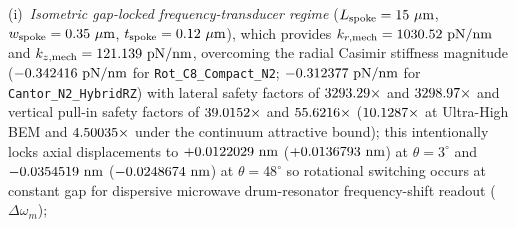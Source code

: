 (i)~\emph{Isometric gap-locked frequency-transducer regime} ($L_{\rm spoke} = \NatureRotCeightCompactNtwoLateralStabilityLSpokeUm{}\ \mu\text{m}$, $w_{\rm spoke} = \NatureRotCeightCompactNtwoLateralStabilityWSpokeUm{}\ \mu\text{m}$, $t_{\rm spoke} = \NatureRotCeightCompactNtwoLateralStabilityTSpokeUm{}\ \mu\text{m}$), which provides $k_{r,\rm mech} = 1030.52{}\text{ pN/nm}$ and $k_{z,\rm mech} = 121.139{}\text{ pN/nm}$, overcoming the radial Casimir stiffness magnitude ($-0.342416{}\text{ pN/nm}$ for \texttt{Rot\_C8\_Compact\_N2}; $-0.312377{}\text{ pN/nm}$ for \texttt{Cantor\_N2\_HybridRZ}) with lateral safety factors of $3293.29{}\times$ and $3298.97{}\times$ and vertical pull-in safety factors of $39.0152{}\times$ and $55.6216{}\times$ ($10.1287{}\times$ at Ultra-High BEM and $4.50035{}\times$ under the continuum attractive bound); this intentionally locks axial displacements to $+0.0122029{}\text{ nm}$ ($+0.0136793{}\text{ nm}$) at $\theta=3^\circ$ and $-0.0354519{}\text{ nm}$ ($-0.0248674{}\text{ nm}$) at $\theta=48^\circ$ so rotational switching occurs at constant gap for dispersive microwave drum-resonator frequency-shift readout ($\Delta\omega_m$);
